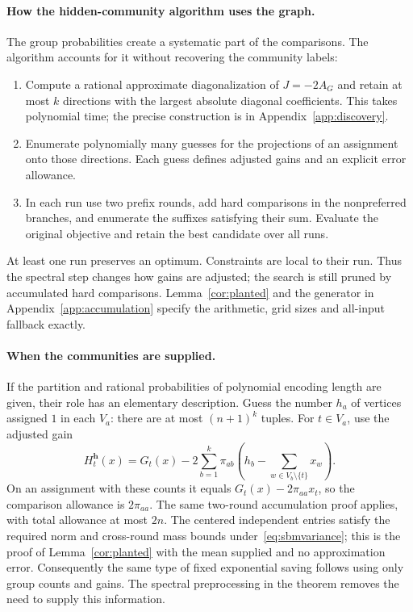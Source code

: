 \documentclass[11pt,a4paper]{article}
\theoremstyle{definition}
\theoremstyle{remark}
\begin{document}
\paragraph{How the hidden-community algorithm uses the graph.}
The group probabilities create a systematic part of the comparisons.
The algorithm accounts for it without recovering the community labels:
\begin{enumerate}
\item Compute a rational approximate diagonalization of $J=-2A_G$ and
retain at most $k$ directions with the largest absolute diagonal coefficients.
This takes polynomial time; the precise construction is in
Appendix~\ref{app:discovery}.
\item Enumerate polynomially many guesses for the projections of an
assignment onto those directions. Each guess defines adjusted gains and
an explicit error allowance.
\item In each run use two prefix rounds, add hard comparisons in the
nonpreferred branches, and enumerate the suffixes satisfying their sum.
Evaluate the original objective and retain the best candidate over all runs.
\end{enumerate}
At least one run preserves an optimum. Constraints are local to their run.
Thus the spectral step changes how gains are adjusted; the search is still
pruned by accumulated hard comparisons. Lemma~\ref{cor:planted} and the
generator in Appendix~\ref{app:accumulation} specify the arithmetic,
grid sizes and all-input fallback exactly.

\paragraph{When the communities are supplied.}
If the partition and rational probabilities of polynomial encoding length
are given, their role has an elementary description. Guess the number
$h_a$ of vertices assigned $1$ in each $V_a$: there are at most $(n+1)^k$
tuples. For $t\in V_a$, use the adjusted gain
\[
 H_t^{\boldsymbol h}(x)=G_t(x)
 -2\sum_{b=1}^k\pi_{ab}
       \left(h_b-\sum_{w\in V_b\setminus\{t\}}x_w\right).
\]
On an assignment with these counts it equals
$G_t(x)-2\pi_{aa}x_t$, so the comparison allowance is $2\pi_{aa}$.
The same two-round accumulation proof applies, with total allowance at
most $2n$. The centered independent entries satisfy the required norm and
cross-round mass bounds under~\eqref{eq:sbmvariance}; this is the proof of
Lemma~\ref{cor:planted} with the mean supplied and no approximation error.
Consequently the same type of fixed exponential saving follows using
only group counts and gains. The spectral preprocessing in the theorem
removes the need to supply this information.
\end{document}
